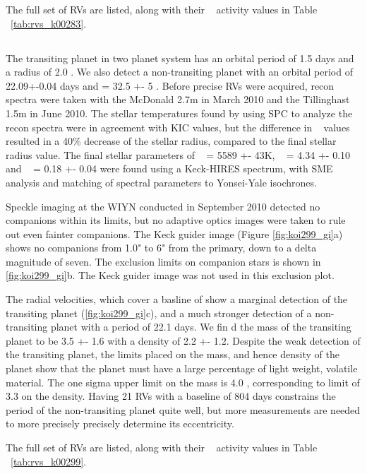 \documentclass{emulateapj}
\begin{document}
The full set of RVs are listed, along with their \rphk~ activity values in Table ~\ref{tab:rvs_k00283}.


\subsection{\koitwoninenine} %

The transiting planet in two planet system has an orbital period of 1.5 days and a radius of 2.0 \rearthe. We also detect a non-transiting planet with an orbital period of 22.09+-0.04 days and \msini = 32.5 +- 5 \mearthe. Before precise RVs were acquired, recon spectra were taken with the McDonald 2.7m in March 2010 and the Tillinghast
 1.5m  in June 2010. The stellar temperatures found by using SPC to analyze  the recon spectra were in agreement with KIC values, but the difference in \logg~  values  resulted in a 40\% decrease of the stellar radius, compared to the final stellar radius value. The final stellar  parameters of \teff~ = 5589 +- 43K, \logg~ = 4.34 +- 0.10 and \feh~ = 0.18 +- 0.04 were found using a Keck-HIRES spectrum, with SME analysis and matching of spectral parameters to Yonsei-Yale isochrones. 

Speckle imaging at the WIYN conducted in September 2010 detected no companions within its limits, but no adaptive optics images were taken to rule out even fainter companions. The Keck guider image (Figure \ref{fig:koi299_gi}a) shows no companions from 1.0" to 6" from the primary, down to a delta magnitude of seven. The exclusion limits on companion stars is shown in \ref{fig:koi299_gi}b. The Keck guider image was not used in this exclusion plot.

The radial velocities, which cover a basline of  show a marginal detection of the transiting planet (\ref{fig:koi299_gi}c),  and a much stronger detection of a non-transiting planet with a period of 22.1 days. We fin d the mass of the transiting planet to be 3.5 +- 1.6 \mearth with a density of 2.2 +- 1.2\gcc. Despite the weak detection of the transiting planet, the limits placed on the mass, and hence density of the planet show that the planet must have a large percentage of light weight, volatile material. The one sigma upper limit on the mass is 4.0 \mearthe, corresponding to limit of 3.3 \gcc on the density. Having 21 RVs with a baseline of 804 days constrains the period of the non-transiting planet quite well, but more measurements are needed to more precisely precisely determine its eccentricity.

The full set of RVs are listed, along with their \rphk~ activity values in Table ~\ref{tab:rvs_k00299}.
\end{document}
